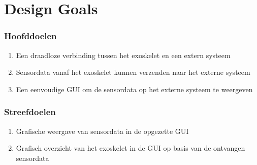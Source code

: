 \section{Design Goals}
\subsubsection{Hoofddoelen}
\begin{enumerate}
	\item Een draadloze verbinding tussen het exoskelet en een extern systeem
	\item Sensordata vanaf het exoskelet kunnen verzenden naar het externe systeem
	\item Een eenvoudige GUI om de sensordata op het externe systeem te weergeven
\end{enumerate}
\subsubsection{Streefdoelen}
\begin{enumerate}
	\item Grafische weergave van sensordata in de opgezette GUI
	\item Grafisch overzicht van het exoskelet in de GUI op basis van de ontvangen sensordata
\end{enumerate}